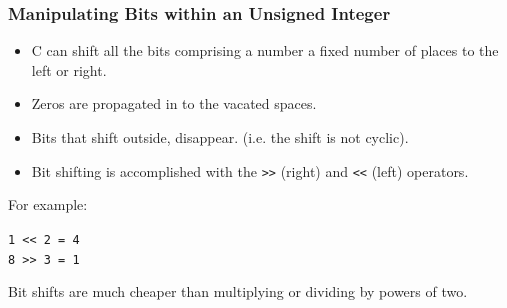 \documentclass[table]{beamer}
\begin{document}
\begin{frame}
\frametitle{Manipulating Bits within an Unsigned Integer}
\begin{itemize}
\item C can shift all the bits comprising a number a fixed number of places to the left or right.
\item Zeros are propagated in to the vacated spaces.
\item Bits that shift outside, disappear. (i.e. the shift is not cyclic).
\item Bit shifting is accomplished with the {\tt >>} (right) and {\tt <<} (left) operators.
\end{itemize}
For example:
\begin{center}
\tt 1 << 2 = 4\\
\tt 8 >> 3 = 1
\end{center}
\begin{block}{}
Bit shifts are much cheaper than multiplying or dividing by powers of two.
\end{block}
\end{frame}
\end{document}
